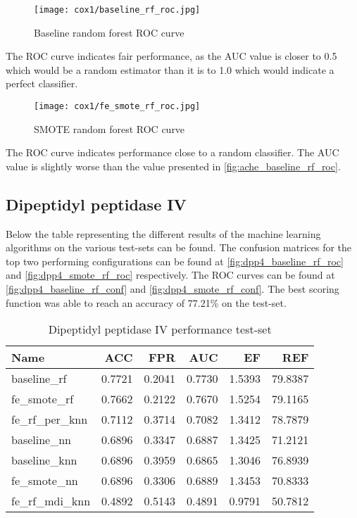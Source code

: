 \begin{figure}[H]
    \begin{center}
        \caption[]{Baseline random forest ROC curve}
        \label{fig:cox1_baseline_rf_roc}
        \texttt{[image: cox1/baseline\_rf\_roc.jpg]}
    \end{center}

\end{figure}
The ROC curve indicates fair performance, as the AUC value is closer to 0.5 which would be a random estimator than it is to 1.0 which would indicate a perfect classifier.

\begin{figure}[H]
    \begin{center}
        \caption[]{SMOTE random forest ROC curve}
        \label{fig:cox1_smote_rf_roc}
        \texttt{[image: cox1/fe\_smote\_rf\_roc.jpg]}
    \end{center}
\end{figure}
The ROC curve indicates performance close to a random classifier. The AUC value is slightly worse than the value presented in \ref*{fig:ache_baseline_rf_roc}.

\subsection{Dipeptidyl peptidase IV}
Below the table representing the different results of the machine learning algorithms on the various test-sets can be found.
The confusion matrices for the top two performing configurations can be found at \ref{fig:dpp4_baseline_rf_roc} and \ref{fig:dpp4_smote_rf_roc}
respectively. The ROC curves can be found at \ref{fig:dpp4_baseline_rf_conf} and \ref{fig:dpp4_smote_rf_conf}.
The best scoring function was able to reach an accuracy of 77.21\% on the test-set.

\begin{table}[H]
    \begin{center}
        \caption{Dipeptidyl peptidase IV performance test-set}
        \begin{tabular}{lrrrrr}
            \toprule
            Name             & ACC    & FPR    & AUC    & EF     & REF     \\
            \midrule
            baseline\_rf     & 0.7721 & 0.2041 & 0.7730 & 1.5393 & 79.8387 \\
            fe\_smote\_rf    & 0.7662 & 0.2122 & 0.7670 & 1.5254 & 79.1165 \\
            fe\_rf\_per\_knn & 0.7112 & 0.3714 & 0.7082 & 1.3412 & 78.7879 \\
            baseline\_nn     & 0.6896 & 0.3347 & 0.6887 & 1.3425 & 71.2121 \\
            baseline\_knn    & 0.6896 & 0.3959 & 0.6865 & 1.3046 & 76.8939 \\
            fe\_smote\_nn    & 0.6896 & 0.3306 & 0.6889 & 1.3453 & 70.8333 \\
            fe\_rf\_mdi\_knn & 0.4892 & 0.5143 & 0.4891 & 0.9791 & 50.7812 \\
            \bottomrule
        \end{tabular}
    \end{center}
\end{table}

